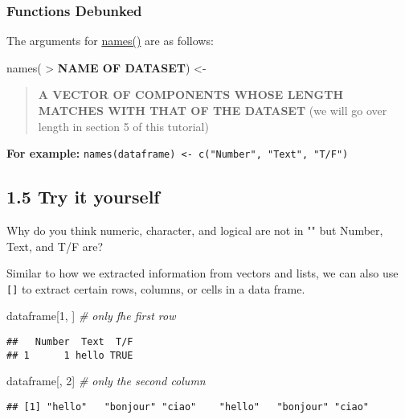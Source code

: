 \documentclass[
]{book}
\newenvironment{Shaded}{\begin{snugshade}}{\end{snugshade}}
\newcommand{\CommentTok}[1]{\textcolor[rgb]{0.56,0.35,0.01}{\textit{#1}}}
\newcommand{\DecValTok}[1]{\textcolor[rgb]{0.00,0.00,0.81}{#1}}
\newcommand{\NormalTok}[1]{#1}
\begin{document}
\hypertarget{functions-debunked-3}{%
\subsubsection{Functions Debunked}\label{functions-debunked-3}}

The arguments for \href{https://www.rdocumentation.org/packages/base/versions/3.6.2/topics/names}{names()} are as follows:

names(
\textgreater{} \textbf{NAME OF DATASET}) \textless-

\begin{quote}
\textbf{A VECTOR OF COMPONENTS WHOSE LENGTH MATCHES WITH THAT OF THE DATASET} (we will go over length in section 5 of this tutorial)
\end{quote}

\textbf{For example:} \texttt{names(dataframe)\ \textless{}-\ c("Number",\ "Text",\ "T/F")}

\hypertarget{try-it-yourself-4}{%
\subsection{1.5 Try it yourself}\label{try-it-yourself-4}}

Why do you think numeric, character, and logical are not in "" but Number, Text, and T/F are?

Similar to how we extracted information from vectors and lists, we can also use \texttt{{[}{]}} to extract certain rows, columns, or cells in a data frame.

\begin{Shaded}
\begin{Highlighting}[]
\NormalTok{dataframe[}\DecValTok{1}\NormalTok{, ] }\CommentTok{\# only fhe first row}
\end{Highlighting}
\end{Shaded}

\begin{verbatim}
##   Number  Text  T/F
## 1      1 hello TRUE
\end{verbatim}

\begin{Shaded}
\begin{Highlighting}[]
\NormalTok{dataframe[, }\DecValTok{2}\NormalTok{] }\CommentTok{\# only the second column}
\end{Highlighting}
\end{Shaded}

\begin{verbatim}
## [1] "hello"   "bonjour" "ciao"    "hello"   "bonjour" "ciao"
\end{verbatim}
\end{document}
